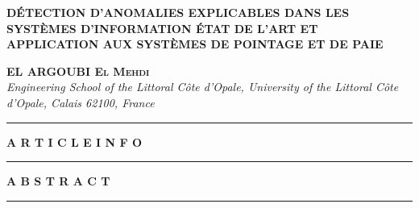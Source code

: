 \documentclass[10pt]{article}
\begin{document}
{
\LARGE \noindent
\textbf{DÉTECTION D’ANOMALIES EXPLICABLES DANS LES SYSTÈMES D’INFORMATION
ÉTAT DE L’ART ET APPLICATION AUX SYSTÈMES DE POINTAGE ET DE PAIE}\par
}


\vspace{0.5cm}



{\color{journalblue}\noindent \bfseries\scshape \Large
EL ARGOUBI El Mehdi
}
{\itshape \color{gray} \noindent \\
Engineering School of the Littoral Côte d’Opale, University of the Littoral Côte d’Opale, Calais 62100, France
}

\vspace{0.4cm}
{\color{journalblue}\hrule}
\vspace{0.4cm}


\begin{minipage}[t]{0.22\textwidth}
\centering
{\color{journalblue}\textbf{A R T I C L E \quad I N F O}}

\vspace{0.1cm}
{\color{journalblue}\rule{\linewidth}{0.6pt}}
\end{minipage}
\hfill
\begin{minipage}[t]{0.73\textwidth}
{\color{journalblue}\textbf{A B S T R A C T}}

\vspace{0.1cm}
{\color{journalblue}\rule{\linewidth}{0.6pt}}
\end{minipage}

\vspace{0.5cm}

\end{document}
